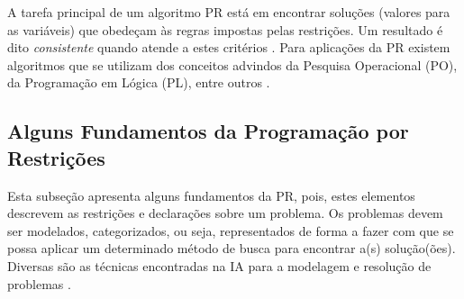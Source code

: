 \documentclass[12pt]{article}
\newcommand{\PR}{Programação por Restrições}
\theoremstyle{definition}
\begin{document}
\begin{comment}
A PPR consiste em um \textit{framework} para resolução de problemas (otimização) combinatoriais. A idéia básica deste \textit{framework} está em modelar um problema com um conjunto de variáveis. As variáveis possuem domínios (os valores possíveis para estas variáveis) e restrições que restringem as possíveis combinações entre as variáveis.
\end{comment}

A tarefa principal de um algoritmo PR está em encontrar soluções (valores para as variáveis) que obedeçam às regras impostas pelas restrições. Um resultado é dito \textit{consistente} quando atende a estes critérios \cite{BARTAK98c}.
Para  aplicações da PR existem algoritmos que se utilizam dos conceitos advindos da Pesquisa Operacional (PO), da Programação em Lógica (PL), entre outros \cite{BARTAK07}. 

\subsection{Alguns Fundamentos da \PR}

Esta subseção   apresenta alguns fundamentos da PR, pois, estes elementos
 descrevem as restrições  e declarações sobre um problema. Os problemas devem ser modelados, categorizados, ou seja, representados de forma a fazer com que se possa aplicar um determinado método de busca para encontrar a(s) 
solução(ões). Diversas são as técnicas encontradas na IA para a modelagem e resolução de problemas \cite{RusNorv}.
\end{document}
